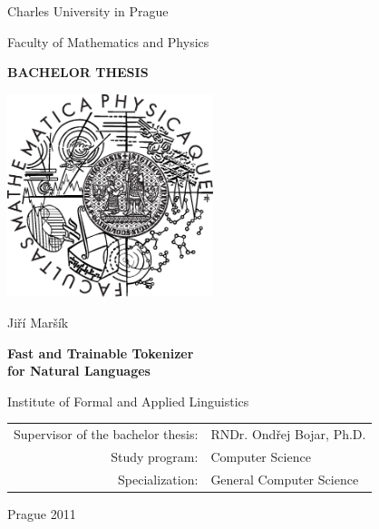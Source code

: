 

\pagestyle{empty}
\begin{center}

\large

Charles University in Prague

\medskip

Faculty of Mathematics and Physics

\vfill

{\bf\Large BACHELOR THESIS}

\vfill

\centerline{\mbox{\includegraphics[width=60mm]{img/logo.eps}}}

\vfill
\vspace{5mm}

{\LARGE Jiří Maršík}

\vspace{15mm}

{\LARGE\bfseries Fast and Trainable Tokenizer \\ for Natural Languages}

\vfill

Institute of Formal and Applied Linguistics

\vfill

\begin{tabular}{rl}

Supervisor of the bachelor thesis: & RNDr. Ondřej Bojar, Ph.D. \\
\noalign{\vspace{2mm}}
Study program: & Computer Science \\
\noalign{\vspace{2mm}}
Specialization: & General Computer Science \\
\end{tabular}

\vfill

Prague 2011

\end{center}


